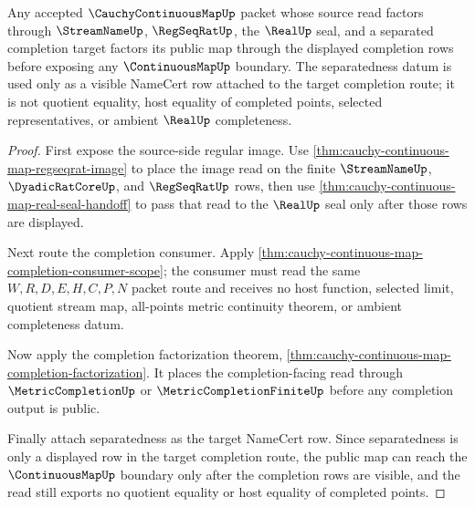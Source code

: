\begin{theorem}
\label{thm:cauchy-continuous-map-separated-completion-factorization}
Any accepted $\CauchyContinuousMapUp$ packet whose source read factors through $\StreamNameUp$, $\RegSeqRatUp$, the $\RealUp$ seal, and a separated completion target factors its public map through the displayed completion rows before exposing any $\ContinuousMapUp$ boundary. The separatedness datum is used only as a visible NameCert row attached to the target completion route; it is not quotient equality, host equality of completed points, selected representatives, or ambient $\RealUp$ completeness.
\end{theorem}
\begin{proof}
First expose the source-side regular image. Use \autoref{thm:cauchy-continuous-map-regseqrat-image} to place the image read on the finite $\StreamNameUp$, $\DyadicRatCoreUp$, and $\RegSeqRatUp$ rows, then use \autoref{thm:cauchy-continuous-map-real-seal-handoff} to pass that read to the $\RealUp$ seal only after those rows are displayed.

Next route the completion consumer. Apply \autoref{thm:cauchy-continuous-map-completion-consumer-scope}; the consumer must read the same $W,R,D,E,H,C,P,N$ packet route and receives no host function, selected limit, quotient stream map, all-points metric continuity theorem, or ambient completeness datum.

Now apply the completion factorization theorem, \autoref{thm:cauchy-continuous-map-completion-factorization}. It places the completion-facing read through $\MetricCompletionUp$ or $\MetricCompletionFiniteUp$ before any completion output is public.

Finally attach separatedness as the target NameCert row. Since separatedness is only a displayed row in the target completion route, the public map can reach the $\ContinuousMapUp$ boundary only after the completion rows are visible, and the read still exports no quotient equality or host equality of completed points.
\end{proof}


